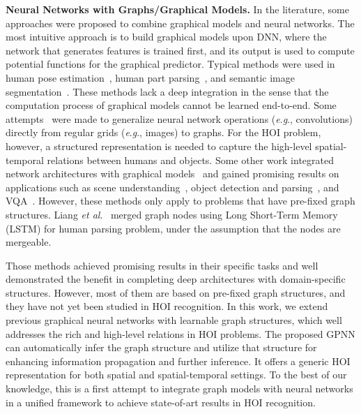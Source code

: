 \documentclass[runningheads]{llncs}
\newcommand{\etal}{\textit{et al}.}
\newcommand{\eg}{\textit{e}.\textit{g}.}
\begin{document}
\noindent\textbf{Neural Networks with Graphs/Graphical Models.}
In the literature, some approaches were proposed to combine graphical models and neural networks. The most intuitive approach is to build graphical models upon DNN, where the network that generates features is trained first, and its output is used to compute potential functions for the graphical predictor. Typical methods were used in human pose estimation~\cite{tompson2014joint}, human part parsing~\cite{xia2016pose,park2017attribute}, and semantic image segmentation~\cite{chen2016deeplab,chen2015learning}. These methods lack a deep integration in the sense that the computation process of graphical models cannot be learned end-to-end.
Some attempts~\cite{zheng2015conditional,wu2016deep,monti2016geometric,kipf2017semi,simonovsky2017dynamic,defferrard2016convolutional,niepert2016learning,seo2016structured} were made to generalize neural network operations (\eg, convolutions) directly from regular grids (\eg, images) to graphs. For the HOI problem, however, a structured representation is needed to capture the high-level spatial-temporal relations between humans and objects. Some other work integrated network architectures with graphical models~\cite{jain2016structural,gilmer2017neural} and gained promising results on applications such as scene understanding~\cite{xu2017scene, marino2016more, li2017situation}, object detection and parsing~\cite{liang2016semantic, yuan2017temporal}, and VQA~\cite{teney2016graph}. However, these methods only apply to problems that have pre-fixed graph structures. Liang \etal~\cite{liang2017interpretable} merged graph nodes using Long Short-Term Memory (LSTM) for human parsing problem, under the assumption that the nodes are mergeable.

Those methods achieved promising results in their specific tasks and well demonstrated the benefit in completing deep architectures with domain-specific structures. However, most of them are based on pre-fixed graph structures, and they have not yet been studied in HOI recognition.
In this work, we extend previous graphical neural networks with learnable graph structures, which well addresses the rich and high-level relations in HOI problems. The proposed GPNN can automatically infer the graph structure and utilize that structure for enhancing information propagation and further inference. It offers a generic HOI representation for both spatial and spatial-temporal settings. To the best of our knowledge, this is a first attempt to integrate graph models with neural networks in a unified framework to achieve state-of-art results in HOI recognition.
\end{document}
